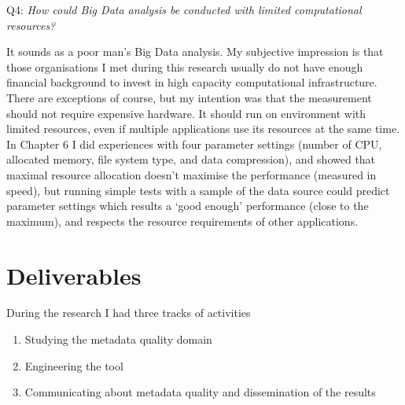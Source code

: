 Q4: \emph{How could Big Data analysis be conducted with limited computational resources?}

It sounds as a poor man's Big Data analysis. My subjective impression is that those organisations I met during this research usually do not have enough financial background to invest in high capacity computational infrastructure. There are exceptions of course, but my intention was that the measurement should not require expensive hardware. It should run on environment with limited resources, even if multiple applications use its resources at the same time. In Chapter 6 I did experiences with four parameter settings (number of CPU, allocated memory, file system type, and data compression), and showed that maximal resource allocation doesn't maximise the performance (measured in speed), but running simple tests with a sample of the data source could predict parameter settings which results a `good enough' performance (close to the maximum), and respects the resource requirements of other applications.


\section{Deliverables}

During the research I had three tracks of activities

\begin{enumerate}
  \setlength{\parskip}{0pt}
  \setlength{\itemsep}{0pt plus 1pt}
\item Studying the metadata quality domain
\item Engineering the tool
\item Communicating about metadata quality and dissemination of the results
\end{enumerate}


